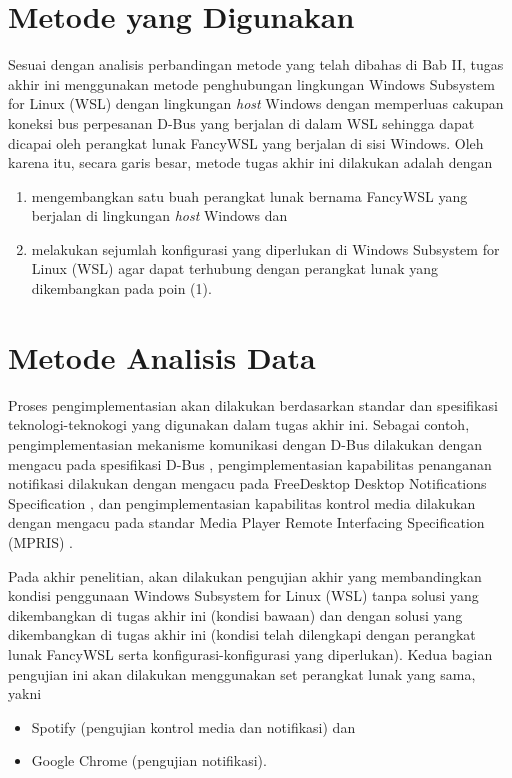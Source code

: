 \section{Metode yang Digunakan}

Sesuai dengan analisis perbandingan metode yang telah dibahas di Bab II, tugas akhir ini menggunakan metode penghubungan lingkungan Windows Subsystem for Linux (WSL) dengan lingkungan \textit{host} Windows dengan memperluas cakupan koneksi bus perpesanan D-Bus yang berjalan di dalam WSL sehingga dapat dicapai oleh perangkat lunak FancyWSL yang berjalan di sisi Windows. Oleh karena itu, secara garis besar, metode tugas akhir ini dilakukan adalah dengan
\begin{enumerate}
    \item mengembangkan satu buah perangkat lunak bernama FancyWSL yang berjalan di lingkungan \textit{host} Windows dan
    \item melakukan sejumlah konfigurasi yang diperlukan di Windows Subsystem for Linux (WSL) agar dapat terhubung dengan perangkat lunak yang dikembangkan pada poin (1).
\end{enumerate}

\section{Metode Analisis Data}

Proses pengimplementasian akan dilakukan berdasarkan standar dan spesifikasi teknologi-teknokogi yang digunakan dalam tugas akhir ini. Sebagai contoh, pengimplementasian mekanisme komunikasi dengan D-Bus dilakukan dengan mengacu pada spesifikasi D-Bus \cite{dbus-specification}, pengimplementasian kapabilitas penanganan notifikasi dilakukan dengan mengacu pada FreeDesktop Desktop Notifications Specification \cite{xdg-desktop-notifications-specification}, dan pengimplementasian kapabilitas kontrol media dilakukan dengan mengacu pada standar Media Player Remote Interfacing Specification (MPRIS) \cite{xdg-mpris-specification}.

Pada akhir penelitian, akan dilakukan pengujian akhir yang membandingkan kondisi penggunaan Windows Subsystem for Linux (WSL) tanpa solusi yang dikembangkan di tugas akhir ini (kondisi bawaan) dan dengan solusi yang dikembangkan di tugas akhir ini (kondisi telah dilengkapi dengan perangkat lunak FancyWSL serta konfigurasi-konfigurasi yang diperlukan). Kedua bagian pengujian ini akan dilakukan menggunakan set perangkat lunak yang sama, yakni
\begin{itemize}
    \item Spotify (pengujian kontrol media dan notifikasi) dan
    \item Google Chrome (pengujian notifikasi).
\end{itemize}
